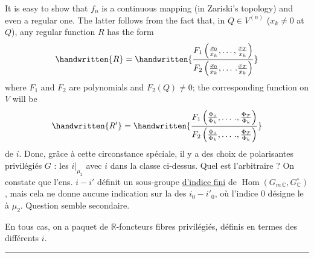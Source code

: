 It is easy to show that $f_n$ is a continuous mapping
(in Zariski's topology) and even a regular one. The latter
follows from the fact that, in $Q\in V^{(n)}$ ($x_k\ne 0$ at $Q$),
any regular function $R$ has the form
\[
\handwritten{R}=\handwritten{\frac{F_1\left(\frac{x_0}{x_k},\ldots,\frac{x_T}{x_k}\right)}{F_2\left(\frac{x_0}{x_k},\ldots\,.\frac{x_T}{x_k}\right)}}
\]
where $F_1$ and $F_2$ are polynomials and $F_2(Q)\ne0$; the
corresponding function on $V$ will be
\[
\handwritten{R'}=\handwritten{\frac{F_1\left(\frac{\Phi_0}{\Phi_k},\ldots\,.,\frac{\Phi_T}{\Phi_k}\right)}{F_2\left(\frac{\Phi_0}{\Phi_k},\ldots\,.,\frac{\Phi_T}{\Phi_k}\right)}}
\]
de $i$.  Donc, grâce à cette circonstance
spéciale, il y a des choix de  
polarisantes privilégiés  $G$ : les
$i|_{\mu_2}$ avec $i$ dans la classe ci-dessus.
Quel est l'arbitraire ? On constate que l'ens.
 $i-i'$  définit un
sous-groupe \uline{d'indice fini} de $\operatorname{Hom}(G_{m\,\mathbb C},G^\circ_{\mathbb C})$,
mais cela ne donne aucune indication sur la
 des $i_0-i'_0$, où l'indice $0$ désigne le
 à $\mu_2$. Question semble secondaire.

\margin{$\vert\!\vert\!\vert$}En tous cas, on a   paquet de
$\mathbb R$-foncteurs fibres privilégiés, définis en termes des
différents $i$.

\begin{center}\rule{2.2cm}{0.3pt}\end{center}

